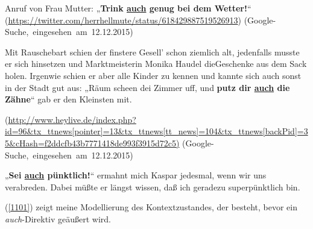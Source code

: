 \begin{exe}
	\ex\label{1098} 

 	Anruf von Frau Mutter: „\textbf{Trink \ul{auch} genug bei dem Wetter!}“
	\newline
	\hbox{}\hfill\hbox{\scriptsize(\url{https://twitter.com/herrhellmute/status/618429887519526913})} 
  	\newline
	\hbox{}\hfill\hbox{(Google-Suche, eingesehen am 12.12.2015)}		
\end{exe}	
								                    
\begin{exe}
	\ex\label{1099} 

 	Mit Rauschebart schien der finstere Gesell' schon ziemlich alt, jedenfalls musste er sich hinsetzen und Marktmeisterin Monika Haudel die\linebreak Geschenke aus 	dem Sack holen. Irgenwie schien er aber alle Kinder zu kennen und kannte sich auch sonst in der Stadt gut aus: „Räum scheen dei Zimmer uff, und 		\textbf{putz dir \ul{auch} die Zähne}“ gab er den Kleinsten mit. 
	\begin{sloppypar}	{\scriptsize(\url{http://www.heylive.de/index.php?id=96\&tx\_ttnews[pointer]=13\&tx\_ttnews[tt\_news]=104\&tx\_ttnews[backPid]=35\&cHash=f2ddcfb43b7771418de993f3915d72c5)}}
	\newline\hbox{}\hfill\hbox{(Google-Suche, eingesehen am 12.12.2015)}\end{sloppypar}
\end{exe}
									
\begin{exe}
	\ex\label{1100} 

 	„\textbf{Sei \ul{auch} pünktlich!}“ ermahnt mich Kaspar jedesmal, wenn wir uns verabreden. Dabei müßte er längst wissen, daß ich 			geradezu superpünktlich bin.
\end{exe}
(\ref{1101}) zeigt meine Modellierung des Kontextzustandes, der besteht, bevor ein \linebreak\textit{auch}-Direktiv geäußert wird.\pagebreak


